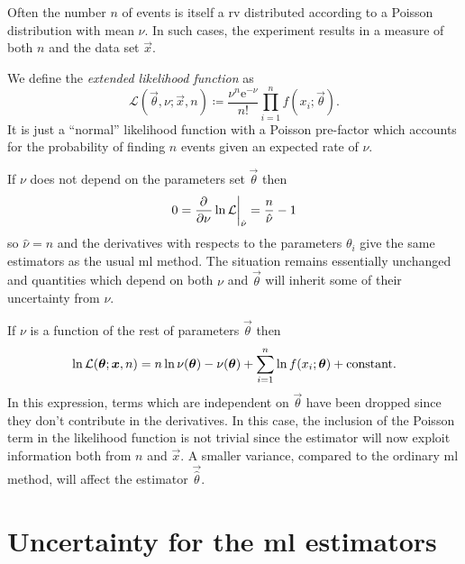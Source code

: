 \documentclass[
	10pt,
	draft
]{scrreprt}
\newcommand{\lkhd}{\ensuremath{\mathcal{L}}}
\newcommand{\eu}{\ensuremath{\mathrm{e}}}
\newcommand{\pderiv}[3][]{\dfrac{{\de^{#1}}#2}{\de #3^{#1}}}%
\begin{document}
Often the number $n$ of events is itself a \ac{rv} distributed according to a Poisson distribution with mean $\nu$.
In such cases, the experiment results in a measure of both $n$ and the data set $\vec{x}$.


We define the \emph{extended likelihood function} as
\begin{equation}
\lkhd(\vec{\theta},\nu;\vec{x},n) \coloneqq \frac{\nu^n\eu^{-\nu}}{n!}\prod_{i=1}^n f(x_i;\vec{\theta}).
\end{equation}
It is just a ``normal'' likelihood function with a Poisson pre-factor which accounts for the probability of finding $n$ events given an expected rate of $\nu$.


If $\nu$ does not depend on the parameters set $\vec{\theta}$ then
\begin{equation}
0 = \pderiv{}{\nu}\ln\lkhd\bigg\rvert_{\hat\nu} = \frac{n}{\hat\nu}-1
\end{equation}
so $\hat\nu = n$ and the derivatives with respects to the parameters $\theta_i$ give the same estimators as the usual \ac{ml} method.
The situation remains essentially unchanged and quantities which depend on both $\nu$ and $\vec{\theta}$ will inherit some of their uncertainty from $\nu$.



If $\nu$ is a function of the rest of parameters $\vec{\theta}$ then
\begin{equation}
\ln\lkhd(\vec{\theta}; \vec{x}, n) = n \ln \nu(\vec{\theta}) - \nu (\vec{\theta})+
\sum_{i=1} ^ n \ln f(x_i; \vec{\theta}) + \textup{constant}.
\end{equation}
In this expression, terms which are independent on $\vec{\theta}$ have been dropped since they don't contribute in the derivatives.
In this case, the inclusion of the Poisson term in the likelihood function is not trivial since the estimator \vec{\hat\theta} will now exploit information both from $n$ and $\vec{x}$.
A smaller variance, compared to the ordinary \ac{ml} method, will affect the estimator $\vec{\hat\theta}$.


	\section{Uncertainty for the \acs{ml} estimators}
\end{document}
